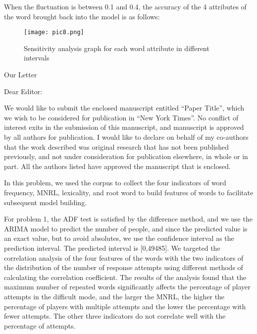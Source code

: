 \documentclass[12pt]{article}  %
\begin{document}
	When the fluctuation is between 0.1 and 0.4, the accuracy of the 4 attributes of the word brought back into the model is as follows:
	
	\begin{figure}[H]
		\centering
		\texttt{[image: pic8.png]}
		\caption{Sensitivity analysis graph for each word attribute in different intervals}
		\label{img}
	\end{figure}




\begin{letter}{Our Letter}
	\begin{flushleft}  %
	Dear Editor:
	\end{flushleft}

We would like to submit the enclosed manuscript entitled “Paper Title”, which we wish to be considered for publication in “New York Times”. No conflict of interest exits in the submission of this manuscript, and manuscript is approved by all authors for publication. I would like to declare on behalf of my co-authors that the work described was original research that has not been published previously, and not under consideration for publication elsewhere, in whole or in part. All the authors listed have approved the manuscript that is enclosed.

In this problem, we used the corpus to collect the four indicators of word frequency, MNRL, lexicality, and root word to build features of words to facilitate subsequent model building.

For problem 1, the ADF test is satisfied by the difference method, and we use the ARIMA model to predict the number of people, and since the predicted value is an exact value, but to avoid absolutes, we use the confidence interval as the prediction interval. The predicted interval is [0,49485]. We targeted the correlation analysis of the four features of the words with the two indicators of the distribution of the number of response attempts using different methods of calculating the correlation coefficient. The results of the analysis found that the maximum number of repeated words significantly affects the percentage of player attempts in the difficult mode, and the larger the MNRL, the higher the percentage of players with multiple attempts and the lower the percentage with fewer attempts. The other three indicators do not correlate well with the percentage of attempts.


\end{letter}
\end{document}
